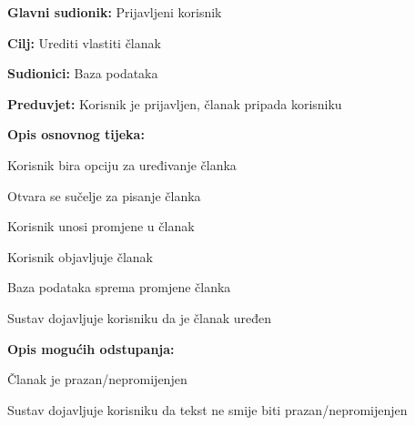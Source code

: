 \noindent {}
\begin{packed_item}

\item \textbf{Glavni sudionik:} Prijavljeni korisnik
\item  \textbf{Cilj:} Urediti vlastiti članak
\item  \textbf{Sudionici:} Baza podataka
\item  \textbf{Preduvjet:} Korisnik je prijavljen, članak pripada korisniku
\item  \textbf{Opis osnovnog tijeka:}

\item[] \begin{packed_enum}

    \item Korisnik bira opciju za uređivanje članka
    \item Otvara se sučelje za pisanje članka
    \item Korisnik unosi promjene u članak
    \item Korisnik objavljuje članak
    \item Baza podataka sprema promjene članka
    \item Sustav dojavljuje korisniku da je članak uređen

\end{packed_enum}

\item  \textbf{Opis mogućih odstupanja:}

\item[] \begin{packed_item}

    \item[3.a] Članak je prazan/nepromijenjen

    \item[] \begin{packed_enum}

        \item Sustav dojavljuje korisniku da tekst ne smije biti prazan/nepromijenjen

    \end{packed_enum}

\end{packed_item}

\end{packed_item}

